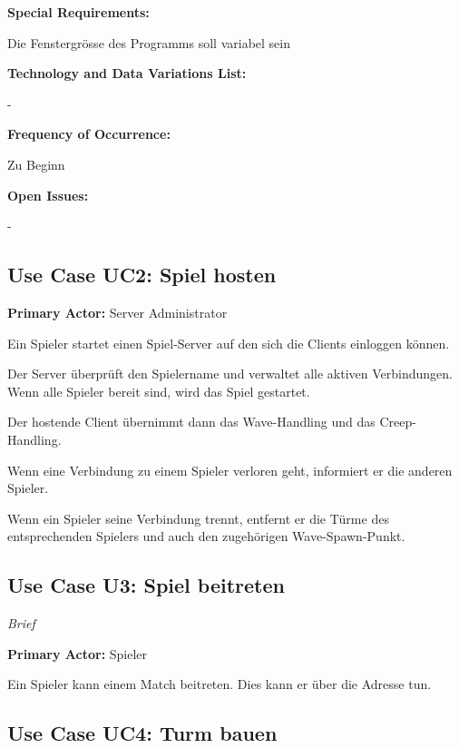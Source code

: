 \textbf{Special Requirements:}

Die Fenstergrösse des Programms soll variabel sein


\textbf{Technology and Data Variations List:}

-


\textbf{Frequency of Occurrence:}

Zu Beginn


\textbf{Open Issues:}

-





\subsection{Use Case UC2: Spiel hosten}

\textbf{Primary Actor:} Server Administrator

Ein Spieler startet einen Spiel-Server auf den sich die Clients einloggen können.

Der Server überprüft den Spielername und verwaltet alle aktiven Verbindungen. Wenn alle Spieler bereit sind, wird das Spiel gestartet.

Der hostende Client übernimmt dann das Wave-Handling und das Creep-Handling.

Wenn eine Verbindung zu einem Spieler verloren geht, informiert er die anderen Spieler.

Wenn ein Spieler seine Verbindung trennt, entfernt er die Türme des entsprechenden Spielers und auch den zugehörigen Wave-Spawn-Punkt.




\subsection{Use Case U3: Spiel beitreten}
\textit{Brief}

\textbf{Primary Actor:} Spieler

Ein Spieler kann einem Match beitreten. Dies kann er über die Adresse tun.




\subsection{Use Case UC4: Turm bauen}

